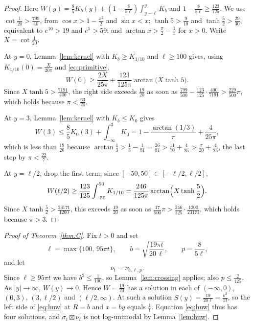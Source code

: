 \documentclass[11pt]{amsart}
\theoremstyle{remark}
\begin{document}
\begin{proof}
Here $W(y)=\frac85K_b(y)+(1-\frac8{5\ell})\int_{y-\ell}^yK_b$ and $1-\frac8{5\ell}\ge\frac{123}{125}$. We use $\cot\frac1{20}>\frac{799}{40}$, from $\cos x>1-\frac{x^2}2$ and $\sin x<x$; $\tanh5>\frac9{10}$ and $\tanh\frac52>\frac{29}{30}$, equivalent to $e^{10}>19$ and $e^5>59$; and $\arctan x>\frac\pi2-\frac1x$ for $x>0$. Write $X=\cot\frac1{20}$.

At $y=0$, Lemma~\ref{lem:kernel} with $K_b\ge K_{1/10}$ and $\ell\ge100$ gives, using $K_{1/10}(0)=\frac{X}{20\pi}$ and \eqref{eq:primitive},
\[
W(0)\ge\frac{2X}{25\pi}+\frac{123}{125\pi}\arctan\bigl(X\tanh5\bigr).
\]
Since $X\tanh5>\frac{7191}{400}$, the right side exceeds $\frac{19}{20}$ as soon as $\frac{799}{500}-\frac{123}{125}\cdot\frac{400}{7191}>\frac{229}{500}\pi$, which holds because $\pi<\frac{63}{20}$.

At $y=3$, Lemma~\ref{lem:kernel} with $K_b\le K_0$ gives
\[
W(3)\le\frac85K_0(3)+\int_{-\infty}^3K_0=1-\frac{\arctan(1/3)}\pi+\frac4{25\pi},
\]
which is less than $\frac{19}{20}$ because $\arctan\frac13>\frac13-\frac1{81}=\frac{26}{81}>\frac{11}{70}+\frac4{25}>\frac\pi{20}+\frac4{25}$, the last step by $\pi<\frac{22}7$.

At $y=\ell/2$, drop the first term; since $[-50,50]\subset[-\ell/2,\ell/2]$,
\[
W(\ell/2)\ge\frac{123}{125}\int_{-50}^{50}K_{1/10}=\frac{246}{125\pi}\arctan\Bigl(X\tanh\frac52\Bigr).
\]
Since $X\tanh\frac52>\frac{23171}{1200}$, this exceeds $\frac{19}{20}$ as soon as $\frac{17}{500}\pi>\frac{246}{125}\cdot\frac{1200}{23171}$, which holds because $\pi>3$.
\end{proof}

\begin{proof}[Proof of Theorem~\ref{thm:C}]
Fix $t>0$ and set
\[
\ell=\max\{100,\,95\pi t\},\qquad b=\sqrt{\frac{19\pi t}{20\,\ell}},\qquad p=\frac8{5\ell},
\]
and let
\begin{equation}\label{eq:witness}
\nu_t=\nu_{b,\ell,p}.
\end{equation}
Since $\ell\ge95\pi t$ we have $b^2\le\frac1{100}$, so Lemma~\ref{lem:crossing} applies; also $p\le\frac2{125}$. As $|y|\to\infty$, $W(y)\to0$. Hence $W=\frac{19}{20}$ has a solution in each of $(-\infty,0)$, $(0,3)$, $(3,\ell/2)$ and $(\ell/2,\infty)$. At such a solution $S(y)=\frac{19}{20\ell}=\frac{b^2}{\pi t}$, so the left side of \eqref{eq:huw} at $R=b$ and $x=by$ equals $\frac1t$. Equation \eqref{eq:huw} thus has four solutions, and $\sigma_t\boxtimes\nu_t$ is not log-unimodal by Lemma~\ref{lem:huw}.
\end{proof}
\end{document}
